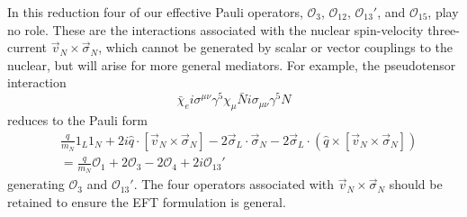 \documentclass{book}[letterpaper,12pt]
\begin{document}
In this reduction four of our effective Pauli operators, $\mathcal{O}_3$, $\mathcal{O}_{12}$, $\mathcal{O}_{13}'$, and $\mathcal{O}_{15}$, play no role. These are the interactions associated with the nuclear spin-velocity three-current $\vec{v}_N\times\vec{\sigma}_N$, which cannot be generated by scalar or vector couplings to the nuclear, but will arise for more general mediators. For example, the pseudotensor interaction
\begin{equation}
\bar{\chi}_ei\sigma^{\mu\nu}\gamma^5\chi_{\mu}\bar{N}i\sigma_{\mu\nu}\gamma^5N
\end{equation}
reduces to the Pauli form
\begin{equation}
\begin{split}
&\frac{q}{m_N}1_L1_N+2i\hat{q}\cdot\left[\vec{v}_N\times\vec{\sigma}_N\right]-2\vec{\sigma}_L\cdot\vec{\sigma}_N-2\vec{\sigma}_L\cdot\left(\hat{q}\times\left[\vec{v}_N\times\vec{\sigma}_N\right]\right)\\
&=\frac{q}{m_N}\mathcal{O}_1+2\mathcal{O}_3-2\mathcal{O}_4+2i\mathcal{O}_{13}'
\end{split}
\end{equation}
generating $\mathcal{O}_3$ and $\mathcal{O}_{13}'$. The four operators associated with $\vec{v}_N\times\vec{\sigma}_N$ should be retained to ensure the EFT formulation is general.
\end{document}

